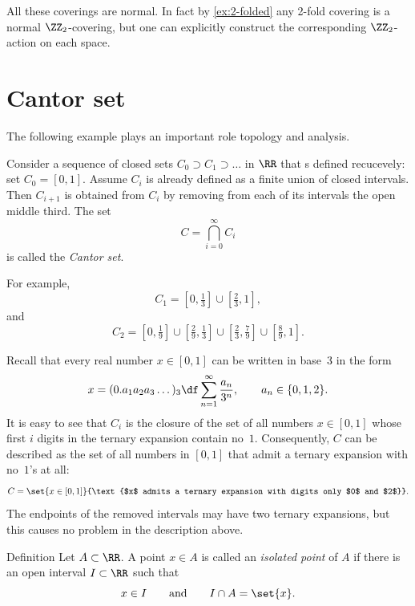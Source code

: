 All these coverings are normal.
In fact by \ref{ex:2-folded} any 2-fold covering is a normal $\ZZ_2$-covering,
but one can explicitly construct the corresponding $\ZZ_2$-action on each space.



\section{Cantor set}\label{sec:cantor-set}

The following example plays an important role topology and analysis.

Consider a sequence of closed sets $C_0\supset C_1\supset\ldots$ in $\RR$ that s defined recucevely: set $C_0=[0,1]$.
Assume $C_i$ is already defined as a finite union of closed intervals.
Then $C_{i+1}$ is obtained from $C_i$ by removing from each of its intervals the open middle third.
The set
\[
C=\bigcap_{i=0}^\infty C_i
\]
is called the \emph{Cantor set}.

For example,
\[
C_1=\left[0,\tfrac13\right]\cup\left[\tfrac23,1\right],
\]
and
\[
C_2=
\left[0,\tfrac19\right]\cup
\left[\tfrac29,\tfrac13\right]\cup
\left[\tfrac23,\tfrac79\right]\cup
\left[\tfrac89,1\right].
\]

Recall that every real number $x\in[0,1]$ can be written in base~$3$ in the form
\[
x=(0.a_1a_2a_3\dots)_3
\df
\sum_{n=1}^\infty \frac{a_n}{3^n},
\qquad
a_n\in\{0,1,2\}.
\]
It is easy to see that $C_i$ is the closure of the set of all numbers $x\in[0,1]$ whose first $i$ digits in the ternary expansion contain no~$1$.
Consequently, $C$ can be described as the set of all numbers in $[0,1]$ that admit a ternary expansion with no~$1$'s at all:
\[
C=
\set{x\in[0,1]}{\text{$x$ admits a ternary expansion with digits only $0$ and $2$}}.
\]
The endpoints of the removed intervals may have two ternary expansions, but this causes no problem in the description above.

\begin{thm}{Definition}\label{def:isolated-point}
Let $A\subset \RR$.
A point $x\in A$ is called an \emph{isolated point} of $A$ if there is an open interval $I\subset \RR$ such that
\[
x\in I
\qquad\text{and}\qquad
I\cap A=\set{x}.
\]
\end{thm}

